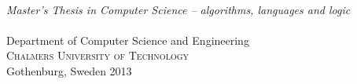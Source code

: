 \begin{titlepage} %

\mbox{}
\vfill
\addtolength{\voffset}{2cm}
\begin{flushleft}
	{\noindent {\Huge \mytitle{}} \\[0.5cm]
	\emph{\Large Master's Thesis in Computer Science -- algorithms, languages and logic} \\[.8cm]%
	
	{\huge \textsc{\myname{}}}\\[.8cm]
	
	{\Large Department of Computer Science and Engineering \\
	\textsc{Chalmers University of Technology} \\
	Gothenburg, Sweden 2013 \\
	} 
	}
\end{flushleft}

\end{titlepage}
\ClearShipoutPicture

\pagestyle{empty}
\newpage
\clearpage
\mbox{}
\newpage
\clearpage
\thispagestyle{empty}

\newpage
\clearpage

\newpage
\clearpage


